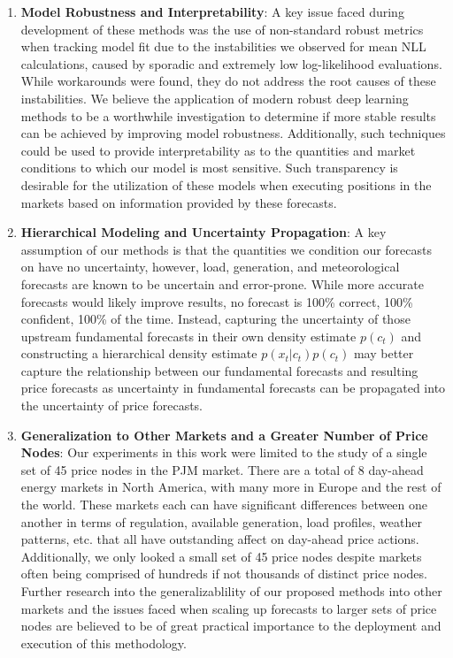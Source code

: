 \begin{enumerate}
    \item \textbf{Model Robustness and Interpretability}: A key issue faced during development of these methods was
          the use of non-standard robust metrics when tracking model fit due to the instabilities we observed for mean
          NLL calculations, caused by sporadic and extremely low log-likelihood evaluations.
          While workarounds were found, they do not address the root causes of these instabilities.
          We believe the application of modern robust deep learning methods to be a worthwhile investigation to determine
          if more stable results can be achieved by improving model robustness.
          Additionally, such techniques could be used to provide interpretability as to the quantities and market
          conditions to which our model is most sensitive.
          Such transparency is desirable for the utilization of these models when executing positions in the markets
          based on information provided by these forecasts.
    \item \textbf{Hierarchical Modeling and Uncertainty Propagation}: A key assumption of our methods is that the
          quantities we condition our forecasts on have no uncertainty, however, load, generation, and meteorological
          forecasts are known to be uncertain and error-prone.
          While more accurate forecasts would likely improve results, no forecast is 100\% correct, 100\% confident, 100\%
          of the time.
          Instead, capturing the uncertainty of those upstream fundamental forecasts in their own density estimate
          $p(c_t)$ and constructing a hierarchical density estimate $p(x_t|c_t)p(c_t)$ may better capture the
          relationship between our fundamental forecasts and resulting price forecasts as uncertainty in fundamental
          forecasts can be propagated into the uncertainty of price forecasts.
    \item \textbf{Generalization to Other Markets and a Greater Number of Price Nodes}: Our experiments in this work
          were limited to the study of a single set of 45 price nodes in the PJM market.
          There are a total of 8 day-ahead energy markets in North America, with many more in Europe and the rest of the
          world.
          These markets each can have significant differences between one another in terms of regulation, available
          generation, load profiles, weather patterns, etc. that all have outstanding affect on day-ahead price actions.
          Additionally, we only looked a small set of 45 price nodes despite markets often being comprised of hundreds
          if not thousands of distinct price nodes.
          Further research into the generalizablility of our proposed methods into other markets and the
          issues faced when scaling up forecasts to larger sets of price nodes are believed to be of great practical
          importance to the deployment and execution of this methodology.
\end{enumerate}
